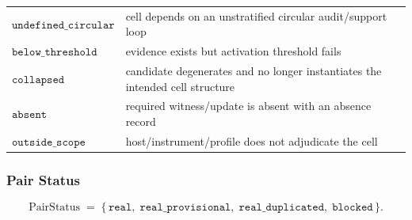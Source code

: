 \documentclass[11pt]{article}
\theoremstyle{definition}
\begin{document}
\begin{longtable}[]{@{}ll@{}}
\begin{minipage}[t]{0.22\columnwidth}\raggedright
\(\texttt{undefined\_circular}\)\strut
\end{minipage} & \begin{minipage}[t]{0.72\columnwidth}\raggedright
cell depends on an unstratified circular audit/support loop\strut
\end{minipage}\tabularnewline
\begin{minipage}[t]{0.22\columnwidth}\raggedright
\(\texttt{below\_threshold}\)\strut
\end{minipage} & \begin{minipage}[t]{0.72\columnwidth}\raggedright
evidence exists but activation threshold fails\strut
\end{minipage}\tabularnewline
\begin{minipage}[t]{0.22\columnwidth}\raggedright
\(\texttt{collapsed}\)\strut
\end{minipage} & \begin{minipage}[t]{0.72\columnwidth}\raggedright
candidate degenerates and no longer instantiates the intended cell structure\strut
\end{minipage}\tabularnewline
\begin{minipage}[t]{0.22\columnwidth}\raggedright
\(\texttt{absent}\)\strut
\end{minipage} & \begin{minipage}[t]{0.72\columnwidth}\raggedright
required witness/update is absent with an absence record\strut
\end{minipage}\tabularnewline
\begin{minipage}[t]{0.22\columnwidth}\raggedright
\(\texttt{outside\_scope}\)\strut
\end{minipage} & \begin{minipage}[t]{0.72\columnwidth}\raggedright
host/instrument/profile does not adjudicate the cell\strut
\end{minipage}\tabularnewline
\bottomrule
\end{longtable}

\subsubsection{Pair Status}

\[
\mathrm{PairStatus}\;=\;\{\,\texttt{real},\;\texttt{real\_provisional},\;\texttt{real\_duplicated},\;\texttt{blocked}\,\}.
\]
\end{document}
